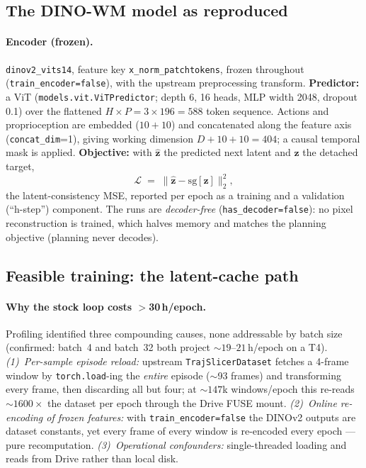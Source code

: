 \documentclass[11pt,a4paper]{article}
\newcommand{\zlat}{\mathbf{z}}
\begin{document}
\subsection{The DINO-WM model as reproduced}
\label{sec:trackii-model}

\paragraph{Encoder (frozen).} \texttt{dinov2\_vits14}, feature key
\texttt{x\_norm\_patchtokens}, frozen throughout (\texttt{train\_encoder=false}),
with the upstream preprocessing transform. \textbf{Predictor:} a ViT
(\texttt{models.vit.ViTPredictor}; depth 6, 16 heads, MLP width 2048, dropout
0.1) over the flattened $H{\times}P = 3{\times}196 = 588$ token sequence.
Actions and proprioception are embedded ($10{+}10$) and concatenated along the
feature axis (\texttt{concat\_dim}=1), giving working dimension
$D{+}10{+}10 = 404$; a causal temporal mask is applied. \textbf{Objective:}
with $\hat{\zlat}$ the predicted next latent and $\zlat$ the detached target,
\begin{equation}
\mathcal{L} \;=\; \big\lVert \hat{\zlat} - \mathrm{sg}[\zlat] \big\rVert_2^2 ,
\label{eq:trackii-loss}
\end{equation}
the latent-consistency MSE, reported per epoch as a training and a validation
(``h-step'') component. The runs are \emph{decoder-free}
(\texttt{has\_decoder=false}): no pixel reconstruction is trained, which halves
memory and matches the planning objective (planning never decodes).

\subsection{Feasible training: the latent-cache path}
\label{sec:cache}

\paragraph{Why the stock loop costs $>$30\,h/epoch.} Profiling identified three
compounding causes, none addressable by batch size (confirmed: batch~4 and
batch~32 both project ${\sim}19$--$21$\,h/epoch on a T4). \emph{(1)~Per-sample
episode reload:} upstream \texttt{TrajSlicerDataset} fetches a 4-frame window by
\texttt{torch.load}-ing the \emph{entire} episode ($\sim$93 frames) and
transforming every frame, then discarding all but four; at ${\sim}147$k
windows/epoch this re-reads ${\sim}1600\times$ the dataset per epoch through the
Drive FUSE mount. \emph{(2)~Online re-encoding of frozen features:} with
\texttt{train\_encoder=false} the DINOv2 outputs are dataset constants, yet
every frame of every window is re-encoded every epoch --- pure recomputation.
\emph{(3)~Operational confounders:} single-threaded loading and reads from Drive
rather than local disk.
\end{document}
